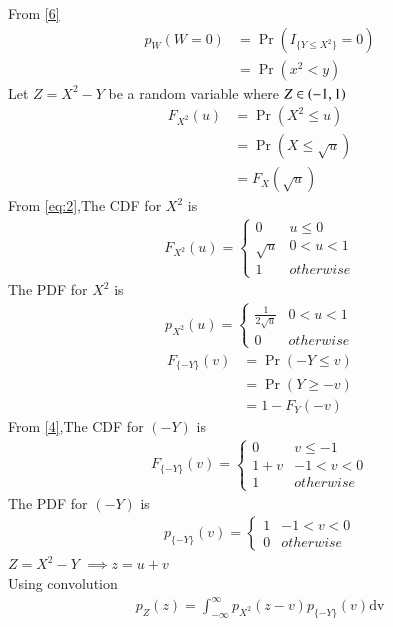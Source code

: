 \documentclass[journal,12pt,twocolumn]{IEEEtran}
\begin{document}
From \eqref{6}
\begin{align}
p_W(W=0) &= \Pr(I_{\{Y\leq X^2\}}=0) \\
         &=\Pr(x^2 <y) \label{7}
\end{align}
Let $Z=X^2-Y$ be a random variable where $Z \in \left(-1,1\right)$
\begin{align}
F_{X^2}(u)&=\Pr(X^2 \leq u) \\
          &=\Pr(X \leq \sqrt{u}) \\
          &=F_X(\sqrt{u}) \label{8}
\end{align}
From \eqref{eq:2},The CDF for $X^2$ is
\begin{align}
F_{X^2}(u)  = 
\begin{cases}
      0 & u \leq 0 \\
      \sqrt{u} & 0 < u < 1 \\
      1 & otherwise
\end{cases} \label{9}
\end{align}
The PDF for $X^2$ is
\begin{align}
p_{X^2}(u)  = 
\begin{cases}
      \frac{1}{2\sqrt{u}} & 0 < u < 1 \\
      0 & otherwise
\end{cases} \label{10}
\end{align}
\begin{align}
F_{\{-Y\}}(v)&=\Pr(-Y \leq v) \\
          &=\Pr(Y \geq -v) \\
          &=1-F_Y(-v) \label{11}
\end{align}
From \eqref{4},The CDF for $(-Y)$ is
\begin{align}
F_{\{-Y\}}(v)  = 
\begin{cases}
      0 & v \leq -1\\
      1+v & -1 < v < 0 \\
      1 & otherwise 
\end{cases}\label{12}
\end{align}
The PDF for $(-Y)$ is
\begin{align}
p_{\{-Y\}}(v)  = 
\begin{cases}
      1 & -1 < v < 0 \\
      0 & otherwise
\end{cases} \label{p-y}
\end{align}
$Z=X^2-Y$ $\implies  z=u+v$\\
Using convolution
\begin{align}
p_Z(z)=\int_{- \infty}^{\infty} p_{X^2}(z-v)p_{\{-Y\}}(v) \mathrm{dv} \label{pz}
\end{align}
\end{document}
